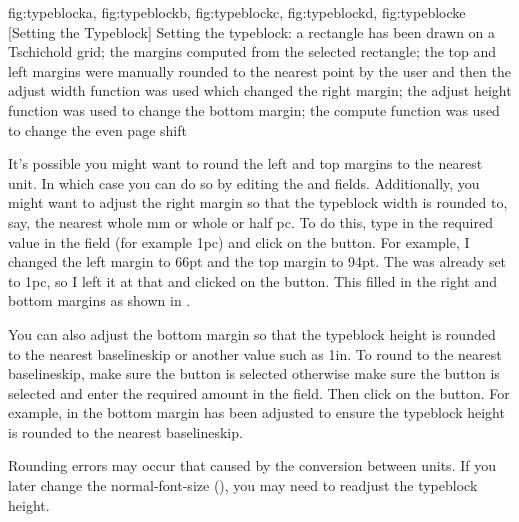 {
  {fig:typeblocka}{}{},
  {fig:typeblockb}{}{},
  {fig:typeblockc}{}{},
  {fig:typeblockd}{}{},
  {fig:typeblocke}{}{}
}
[Setting the Typeblock]
{Setting the typeblock:
 a rectangle has been drawn on
a Tschichold grid;
 the margins computed from the
selected rectangle;
 the top and left margins were
manually rounded to the nearest point by the user and then the
adjust width function was used which changed the right margin;
 the adjust height function was used to change the
bottom margin;
 the compute function was used to
change the even page shift}

It's possible you might want to round the left and top margins to
the nearest unit. In which case you can do so by editing the
 and
 fields. Additionally, you
might want to adjust the right margin so that the
\gls{typeblock} width is rounded to, say, the nearest whole mm or whole or half
pc. To do this, type in the required value in the
 field (for example
1pc) and click on the 
button. For example, I changed the left margin to 66\gls{pt} and the
top margin to 94\gls{pt}. The
 was already set to
1pc, so I left it at that and clicked on the
 button. This filled in the
right and bottom margins as shown in .

You can also adjust the bottom margin so that the \gls{typeblock} height
is rounded to the nearest baselineskip or another value such as 1in.
To round to the nearest baselineskip, make sure the
 button is selected otherwise
make sure the  button is
selected and enter the required amount in the field. Then click on
the  button. For example, in
 the bottom margin has been adjusted to
ensure the \gls{typeblock} height is rounded to the nearest baselineskip.

\begin{warning}
Rounding errors may occur that caused by the conversion between
units. If you later change the \gls{normal-font-size}
(),
you may need to readjust the \gls{typeblock} height.
\end{warning}

